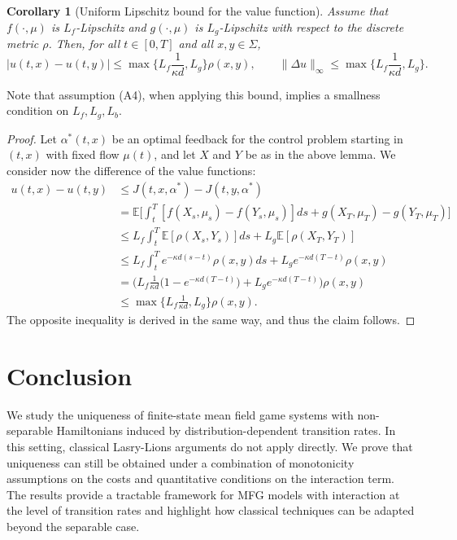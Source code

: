 \documentclass[11pt,a4paper]{amsart}
\newtheorem{corollary}{Corollary}
\theoremstyle{definition}
\newcommand{\E}{\mathbb{E}}
\begin{document}
\begin{corollary}[Uniform Lipschitz bound for the value function]
Assume that $f(\cdot,\mu)$ is $L_f$-Lipschitz and $g(\cdot,\mu)$ is $L_g$-Lipschitz with respect to the discrete metric
$\rho$. Then, for all $t\in[0,T]$ and all $x,y\in\Sigma$,
\[
|u(t,x)-u(t,y)| \le \max\Big\{ L_f \frac{1}{\kappa d}, L_g\Big\}  \rho(x,y),
\qquad
\|\Delta u\|_\infty \le \max\Big\{ L_f \frac{1}{\kappa d}, L_g\Big\} .
\]
\end{corollary}

Note that assumption (A4), when applying this bound, implies a smallness condition on $L_f, L_g, L_b$. 

\begin{proof}
Let $\alpha^*(t,x)$ be an optimal feedback for the control problem starting in $(t,x)$ with fixed flow $\mu(t)$, and let $X$ and $Y$ be as in the above lemma. 
We consider now the difference of the value functions: 
\begin{align*}
    u(t,x) - u(t,y) 
    &\leq J(t,x,\alpha^*) - J(t,y,\alpha^*) \\
    &= \E\bigg[ \int_{t}^{T} [f(X_s,\mu_s) - f(Y_s,\mu_s)]ds  
    + g(X_T,\mu_T) - g(Y_T,\mu_T)\bigg]\\
    &\leq L_f \int_{t}^{T} \E\left[ \rho(X_s , Y_s ) \right] ds
    + L_g \E\left[ \rho(X_T , Y_T ) \right]\\
    &\leq L_f \int_t^T e^{-\kappa d  (s-t)} \rho(x,y)ds
    + L_g e^{-\kappa d  (T-t)} \rho(x,y)  \\
    &= \Big( L_f \frac{1}{\kappa d} \big(1- e^{-\kappa d (T-t)} \big) 
    + L_g e^{-\kappa d (T-t)} \Big)\rho(x,y)  \\
    &\leq \max\Big\{ L_f \frac{1}{\kappa d}, L_g\Big\} \rho(x,y).
\end{align*}
The opposite inequality is derived in the same way, and thus the claim follows. 
%
\end{proof}


\section{Conclusion}\label{sec:conclusion}

We study the uniqueness of finite-state mean field game systems with non-separable Hamiltonians induced by distribution-dependent transition rates. In this setting, classical Lasry-Lions arguments do not apply directly. We prove that uniqueness can still be obtained under a combination of monotonicity assumptions on the costs and quantitative conditions on the interaction term.
The results provide a tractable framework for MFG models with interaction at the level of transition rates and highlight how classical techniques can be adapted beyond the separable case.
\end{document}
